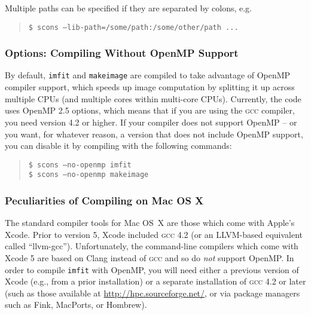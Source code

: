 \documentclass[10pt,a4paper,article]{memoir}
\newcommand{\imfit}{\texttt{imfit}}
\newcommand{\makeimage}{\texttt{makeimage}}
\begin{document}
Multiple paths can be specified if they are separated by colons, e.g.
\begin{quote}
\texttt{\$ scons --lib-path=/some/path:/some/other/path ...} \\
\end{quote}



\subsubsection{Options: Compiling Without OpenMP Support}

By default, \imfit{} and \makeimage{} are compiled to take advantage of
OpenMP compiler support, which speeds up image computation by splitting
it up across multiple CPUs (and multiple cores within multi-core CPUs).
Currently, the code uses OpenMP 2.5 options, which means that if you are
using the \textsc{gcc} compiler, you need version 4.2 or higher. If your compiler
does not support OpenMP -- or you want, for whatever reason, a version
that does not include OpenMP support, you can disable it by compiling
with the following commands:
\begin{quote}
\texttt{\$ scons --no-openmp imfit} \\
\texttt{\$ scons --no-openmp makeimage}
\end{quote}


\subsubsection{Peculiarities of Compiling on Mac OS X}

The standard compiler tools for Mac OS~X are those which come with
Apple's Xcode. Prior to version 5, Xcode included
\textsc{gcc} 4.2 (or an LLVM-based equivalent called ``llvm-gcc'').
Unfortunately, the command-line compilers which come with Xcode 5 are
based on Clang instead of \textsc{gcc} and so do \textit{not} support
OpenMP. In order to compile \imfit{} with OpenMP, you will need either a previous
version of Xcode (e.g., from a prior installation) or a separate
installation of \textsc{gcc} 4.2 or later (such as those available at
\url{http://hpc.sourceforge.net/}, or via package managers such as Fink,
MacPorts, or Hombrew).
\end{document}
